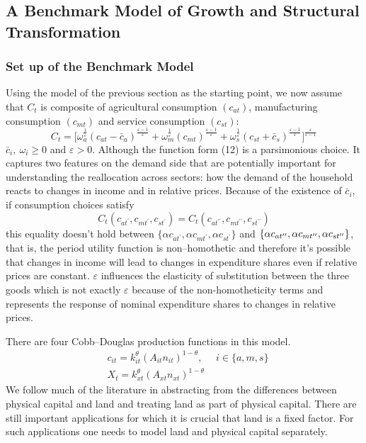 \documentclass{article}
\begin{document}
    \subsection{A Benchmark Model of Growth and Structural Transformation}
    \subsubsection{Set up of the Benchmark Model}
    Using the model of the previous section as the starting point, we now assume that $C_t$ is composite of agricultural consumption $(c_{at})$, manufacturing consumption $(c_{mt})$ and service consumption $(c_{st})$:
    \begin{equation}
        C_t=\biggl[ \omega_a^{\frac{1}{\varepsilon}} (c_{at}-\bar{c}_a)^\frac{\varepsilon-1}{\varepsilon} + \omega_m^{\frac{1}{\varepsilon}} (c_{mt})^\frac{\varepsilon-1}{\varepsilon} + \omega_s^{\frac{1}{\varepsilon}} (c_{st}+\bar{c}_s)^\frac{\varepsilon-1}{\varepsilon} \biggr]^{\frac{\varepsilon}{\varepsilon-1}}
    \end{equation}
    $\bar{c}_i,\ \omega_i \ge 0$ and $\varepsilon >0$. Although the function form (12) is a parsimonious choice. It captures two features on the demand side that are potentially important for understanding the reallocation across sectors: how the demand of the household reacts to changes in income and in relative prices. Because of the existence of $\bar{c}_i$, if consumption choices satisfy
    \begin{equation*}
        C_t(c_{at^\prime},c_{mt^\prime},c_{st^\prime})=C_t(c_{at^{\prime\prime}},c_{mt^{\prime\prime}},c_{st^{\prime\prime}})
    \end{equation*}
    this equality doesn't hold between $\{\alpha c_{at^\prime},\alpha c_{mt^\prime},\alpha c_{st^\prime}\}$ and $\{\alpha c_{at^{\prime\prime}},\alpha c_{mt^{\prime\prime}},\\\alpha c_{st^{\prime\prime}}\}$, that is, the period utility function is non–homothetic and therefore it's possible that changes in income will lead to changes in expenditure shares even if relative prices are constant. $\varepsilon$ influences the elasticity of substitution between the three goods which is not exactly $\varepsilon$ because of the non-homotheticity terms and represents the response of nominal expenditure shares to changes in relative prices. 
    
    There are four Cobb–Douglas production functions in this model.
    \begin{align}
        &c_{it}=k_{it}^\theta (A_{it} n_{it})^{1-\theta},\ \ \ \ \ \ i \in \{a,m,s\}\\
        &X_t=k_{xt}^\theta (A_{xt} n_{xt})^{1-\theta}
    \end{align}
    We follow much of the literature in abstracting from the differences between physical capital and land and treating land as part of physical capital. There are still important applications for which it is crucial that land is a fixed factor. For such applications one needs to model land and physical capital separately.
 
\end{document}
